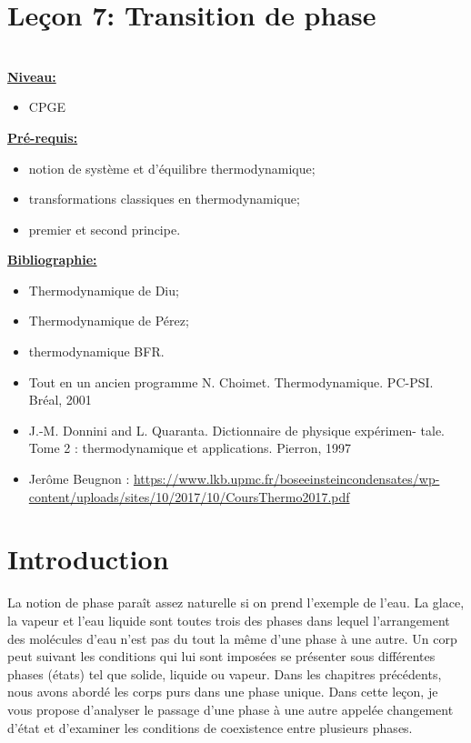 \documentclass[french, a4paper, 10pt, twocolumn, landscape]{article}
\begin{document}
\section*{Leçon 7: Transition de phase}

\hrulefill\\

\noindent\underline{\textbf{Niveau:}}
\begin{itemize}
  \item CPGE 
\end{itemize}
\underline{\textbf{Pr{\'e}-requis: }}

\begin{itemize}
  \item notion de système et d’équilibre thermodynamique;
  \item  transformations classiques en thermodynamique;
  \item premier et second principe.
\end{itemize}
\underline{\textbf{Bibliographie:}}

\begin{itemize}
  \item Thermodynamique de Diu;
  \item Thermodynamique de Pérez;
  \item thermodynamique BFR.
  \item Tout en un ancien programme N. Choimet. Thermodynamique. PC-PSI. Bréal, 2001
  \item J.-M. Donnini and L. Quaranta. Dictionnaire de physique expérimen-
  tale. Tome 2 : thermodynamique et applications. Pierron, 1997
  \item Jerôme Beugnon : \url{https://www.lkb.upmc.fr/boseeinsteincondensates/wp-content/uploads/sites/10/2017/10/CoursThermo2017.pdf}
\end{itemize}
\hrulefill

\section*{Introduction}
La notion de phase paraît assez naturelle si on prend l’exemple de l’eau. La glace, la vapeur et l’eau liquide sont toutes trois des phases dans lequel l’arrangement des molécules d’eau n’est pas du tout la même d’une phase à une autre. Un corp peut suivant les conditions qui lui sont imposées se présenter sous différentes phases (états) tel que solide, liquide ou vapeur. Dans les chapitres précédents, nous avons abordé les corps purs dans une phase unique. Dans cette leçon, je vous propose d'analyser le passage d'une phase à une autre appelée changement d'état et d'examiner les conditions de coexistence entre plusieurs phases.
\end{document}
